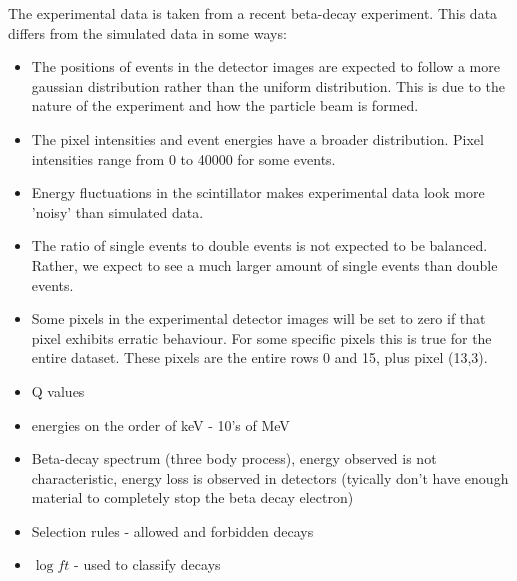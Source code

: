 The experimental data is taken from a recent beta-decay experiment. This data differs
from the simulated data in some ways:
\begin{itemize}
	\item The positions of events in the detector images are expected to follow a more
	gaussian distribution rather than the uniform distribution. This is due to the
	nature of the experiment and how the particle beam is formed.
	\item The pixel intensities and event energies have a broader distribution.
	Pixel intensities range from 0 to 40000 for some events.
	\item Energy fluctuations in the scintillator makes experimental data look more
	'noisy' than simulated data.
	\item The ratio of single events to double events is not expected to be balanced.
	Rather, we expect to see a much larger amount of single events than double events.
	\item Some pixels in the experimental detector images will be set to zero if that
	pixel exhibits erratic behaviour. For some specific pixels this is true for the
	entire dataset. These pixels are the entire rows 0 and 15, plus pixel (13,3).
\end{itemize}


\begin{itemize}
	\item Q values
	\item energies on the order of keV - 10's of MeV
	\item Beta-decay spectrum (three body process), energy observed is not characteristic,
	energy loss is observed in detectors (tyically don't have enough material to completely
	stop the beta decay electron)
	\item Selection rules - allowed and forbidden decays
	\item $\log ft$ - used to classify decays
\end{itemize}


